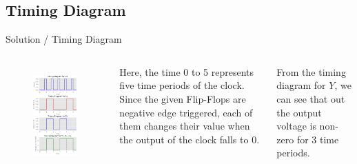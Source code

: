 \documentclass{beamer}
\begin{document}
\subsection{Timing Diagram}
\begin{frame}{Solution / Timing Diagram}
\begin{columns}
\vspace{-0.45cm} %
    \begin{figure}[h]
    \centering
    \scalebox{0.35} {\includegraphics[frame]{img/rsz_graph.png}} 
    \label{fig:graph}
\end{figure}
Here, the time 0 to 5 represents five time periods of the clock. 
Since the given Flip-Flops are negative edge triggered, each of them changes their value when the output of the clock falls to 0.\par
From the timing diagram for $Y$, we can see that out the output voltage is non-zero for 3 time periods.
\end{columns}
\end{frame}
\end{document}
